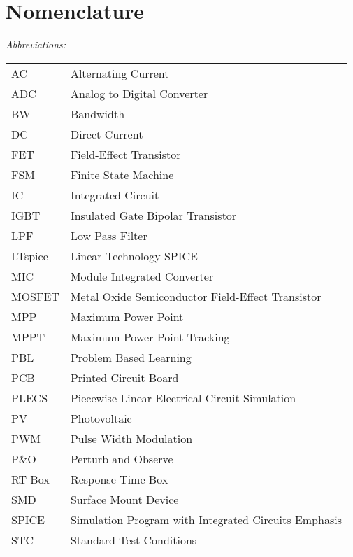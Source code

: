 \chapter*{Nomenclature}


 

\vspace{-10mm} %
\textit{Abbreviations:}\newline
\begin{tabular}{ll} %
AC & Alternating Current\\
ADC & Analog to Digital Converter \\
BW & Bandwidth \\
DC & Direct Current\\
FET & Field-Effect Transistor\\
FSM & Finite State Machine \\
IC & Integrated Circuit\\
IGBT & Insulated Gate Bipolar Transistor \\
LPF & Low Pass Filter\\
LTspice & Linear Technology SPICE \\
MIC & Module Integrated Converter\\
MOSFET & Metal Oxide Semiconductor Field-Effect Transistor\\
MPP & Maximum Power Point\\
MPPT & Maximum Power Point Tracking\\
PBL & Problem Based Learning\\
PCB & Printed Circuit Board\\
PLECS & Piecewise Linear Electrical Circuit Simulation\\
PV & Photovoltaic\\
PWM & Pulse Width Modulation\\
P\&O & Perturb and Observe\\
RT Box & Response Time Box \\
SMD & Surface Mount Device \\
SPICE & Simulation Program with Integrated Circuits Emphasis \\
STC & Standard Test Conditions\\
\end{tabular}

